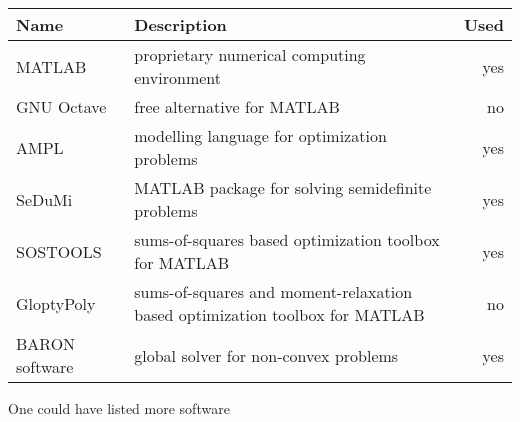 \begin{center}
\begin{tabular}{lp{10cm}r}
	\textbf{Name} & \textbf{Description} & \textbf{Used}
	\\ \hline MATLAB & proprietary numerical computing environment & yes
	\\ GNU Octave & free alternative for MATLAB & no
	\\ \hline AMPL & modelling language for optimization problems & yes
	\\ \hline SeDuMi & MATLAB package for solving semidefinite problems & yes
	\\ \hline SOSTOOLS & sums-of-squares based optimization toolbox for MATLAB & yes
	\\ GloptyPoly & sums-of-squares and moment-relaxation based optimization toolbox for MATLAB & no
	\\ \hline BARON software &  global solver for non-convex problems & yes
\end{tabular}
\end{center}

One could have listed more software

